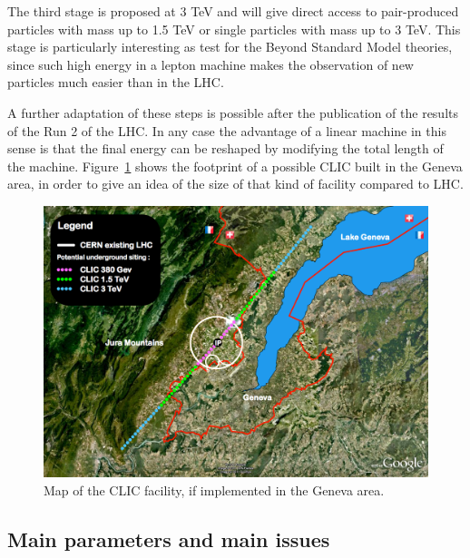 The third stage is proposed at 3 TeV and will give direct access to pair-produced particles with mass up to 1.5 TeV or single particles with mass up to 3 TeV. This stage is particularly interesting as test for the Beyond Standard Model theories, since such high energy in a lepton machine makes the observation of new particles much easier than in the LHC.

A further adaptation of these steps is possible after the publication of the results of the Run 2 of the LHC. In any case the advantage of a linear machine in this sense is that the final energy can be reshaped by modifying the total length of the machine. Figure~\ref{CLIC_map} shows the footprint of a possible CLIC built in the Geneva area, in order to give an idea of the size of that kind of facility compared to LHC.

\begin{figure}[h]
\centering

\includegraphics[scale=0.3]{pictures/CLIC_map}
\caption{Map of the CLIC facility, if implemented in the Geneva area.}
\label{CLIC_map}

\end{figure}


\subsection{Main parameters and main issues}

